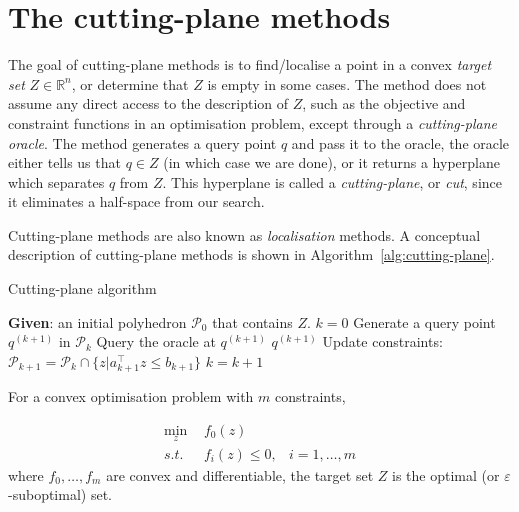 \section{The cutting-plane methods}
\label{sec:problem}

The goal of cutting-plane methods is to find/localise a point in a convex \textit{target set} $Z \in \mathbb{R}^n$,
or determine that $Z$ is empty in some cases. 
The method does not assume any direct access to the description of $Z$,
such as the objective and constraint functions in an optimisation problem, except through a \textit{cutting-plane oracle}.
The method generates a query point $q$ and pass it to the oracle, 
the oracle either tells us that $q \in Z$ (in which case we are done), or it returns a hyperplane which separates $q$ from $Z$.
This hyperplane is called a \textit{cutting-plane}, or \textit{cut}, since it eliminates a half-space from our search.

Cutting-plane methods are also known as \textit{localisation} methods. 
A conceptual description of cutting-plane methods is shown in Algorithm~\ref{alg:cutting-plane}.


\begin{algorithm}[htbp]
\caption{Cutting-plane algorithm}
\label{alg:cutting-plane}
\begin{algorithmic}[1]
\STATE \textbf{Given}: an initial polyhedron $\mathcal{P}_0$ that contains $Z$.
\STATE $k = 0$
\REPEAT
    \STATE Generate a query point $q^{(k+1)}$ in $\mathcal{P}_k$
    \STATE Query the oracle at $q^{(k+1)}$
        \RETURN $q^{(k+1)}$
        \STATE Update constraints: $\mathcal{P}_{k+1} = \mathcal{P}_k \cap \{z | a_{k+1}^\top z \le b_{k+1} \}$
    \ENDIF
    \STATE $k = k + 1$
\end{algorithmic}
\end{algorithm}


\noindent
For a convex optimisation problem with $m$ constraints,

\begin{equation}
\label{eq:cvxprob}
\begin{aligned}
\min_{z} ~& f_0(z)        & \\
s.t.~~   ~& f_i(z) \le 0, & i = 1, \dots, m
\end{aligned} 
\end{equation}
where $f_0, \dots, f_m$ are convex and differentiable, the target set $Z$ is the optimal (or $\varepsilon$-suboptimal) set.

